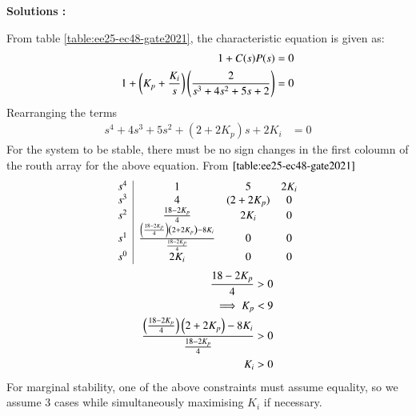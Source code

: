 \documentclass[journal,12pt,onecolumn]{IEEEtran}
\theoremstyle{remark}
\begin{document}
\textbf{Solutions :}
    
    From table \ref{table:ee25-ec48-gate2021}, the characteristic equation is given as:
    \begin{align}
        1+C(s)P(s) &= 0\\
        1+\left(K_p+\frac{K_i}{s}\right)\left(\frac{2}{s^3+4s^2+5s+2}\right) &= 0
    \end{align}
    Rearranging the terms
    \begin{align}
        s^4+4s^3+5s^2+(2+2K_p)s+2K_i &=0
    \end{align}
    For the system to be stable, there must be no sign changes in the first coloumn of the routh array for the above equation. From $\ref{table:ee25-ec48-gate2021}$
    \begin{align}
    \begin{array}{c|cccc}
        s^4 & 1 & 5 & 2K_i \\
        s^3 & 4 & (2 + 2K_p) & 0 \\
        s^2 & \frac{18-2K_p}{4} & 2K_i & 0 \\
        s^1 &  \frac{\left(\frac{18-2K_p}{4}\right)\left(2 + 2K_p\right)-8K_i}{\frac{18-2K_p}{4}} & 0 & 0\\
        s^0 & 2K_i &0 &0 \\
        \end{array}\\
        \end{align}
        \begin{align}
            \frac{18-2K_p}{4} &> 0\\
            \implies K_p &< 9 \label{eq:gate 2021 eq:1}\\
            \frac{\left(\frac{18-2K_p}{4}\right)\left(2 + 2K_p\right)-8K_i}{\frac{18-2K_p}{4}} &> 0\label{eq:gate 2021 eq:2}\\
        K_i &>0 \label{eq:gate 2021 eq:3}
    \end{align}
    For marginal stability, one of the above constraints must assume equality, so we assume 3 cases while simultaneously maximising $K_i$ if necessary.
\end{document}
